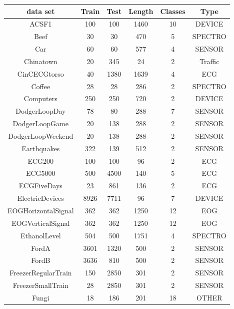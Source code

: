 \begin{table}
\begin{center}
 \begin{longtable}{||c|c|c|c|c|c||} 
 
 \hline
  data set & Train & Test & Length & Classes & Type \\ [0.5ex]
 \hline\hline
 ACSF1 & 100 & 100 & 1460 & 10 & DEVICE \\[1ex]
 \hline
 Beef & 30 & 30 & 470 & 5 & SPECTRO \\[1ex]
 \hline
 Car & 60 & 60 & 577 & 4 & SENSOR \\[1ex]
 \hline
 Chinatown & 20 & 345 & 24 & 2 & Traffic \\[1ex]
 \hline
 CinCECGtorso & 40 & 1380 & 1639 & 4 & ECG \\[1ex]
 \hline
 Coffee & 28 & 28 & 286 & 2 & SPECTRO \\[1ex]
 \hline
 Computers & 250 & 250 & 720 & 2 & DEVICE \\[1ex]
 \hline
 DodgerLoopDay & 78 & 80 & 288 & 7 & SENSOR \\[1ex]
 \hline
 DodgerLoopGame & 20 & 138 & 288 & 2 & SENSOR \\[1ex]
 \hline
 DodgerLoopWeekend & 20 & 138 & 288 & 2 & SENSOR \\[1ex]
 \hline
 Earthquakes & 322 & 139 & 512 & 2 & SENSOR \\[1ex]
 \hline
 ECG200 & 100 & 100 & 96 & 2 & ECG \\[1ex]
 \hline
 ECG5000 & 500 & 4500 & 140 & 5 & ECG \\[1ex]
 \hline
 ECGFiveDays & 23 & 861 & 136 & 2 & ECG \\[1ex]
 \hline
 ElectricDevices & 8926 & 7711 & 96 & 7 & DEVICE \\[1ex]
 \hline
 EOGHorizontalSignal & 362 & 362 & 1250 & 12 & EOG \\[1ex]
 \hline
 EOGVerticalSignal & 362 & 362 & 1250 & 12 & EOG \\[1ex]
 \hline
 EthanolLevel & 504 & 500 & 1751 & 4 & SPECTRO \\[1ex]
 \hline
 FordA & 3601 & 1320 & 500 & 2 & SENSOR \\[1ex]
 \hline
 FordB & 3636 & 810 & 500 & 2 & SENSOR \\[1ex]
 \hline
 FreezerRegularTrain & 150 & 2850 & 301 & 2 & SENSOR \\[1ex]
 \hline
 FreezerSmallTrain & 28 & 2850 & 301 & 2 & SENSOR \\[1ex]
 \hline
 Fungi & 18 & 186 & 201 & 18 & OTHER \\[1ex]

\end{longtable}
\end{center}
\end{table}
